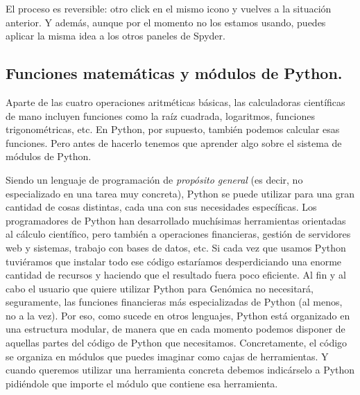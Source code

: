 \documentclass[10pt,a4paper]{article}\usepackage[]{graphicx}\usepackage[]{color}
\newcounter {cont01}
\begin{document}
El proceso es reversible: otro click en el mismo icono y vuelves a la situación anterior. Y además, aunque por el momento no los estamos usando, puedes aplicar la misma idea a los otros paneles de Spyder. 




\subsection{Funciones matemáticas y módulos de Python.}
\label{tut02:subsec:FuncionesMatematicasModulosPython}

Aparte de las cuatro operaciones aritméticas básicas, las calculadoras científicas de mano incluyen funciones como la raíz cuadrada, logaritmos, funciones trigonométricas, etc. En Python, por supuesto, también podemos calcular esas funciones. Pero antes de hacerlo tenemos que aprender algo sobre el sistema de módulos de Python.

Siendo un lenguaje de programación de {\em propósito general} (es decir, no especializado en una tarea muy concreta), Python se puede utilizar para una gran cantidad de cosas distintas, cada una con sus necesidades específicas. Los programadores de Python han desarrollado muchísimas herramientas orientadas al cálculo científico, pero también a operaciones financieras, gestión de servidores web y sistemas, trabajo con bases de datos, etc. Si cada vez que usamos Python tuviéramos que instalar todo ese código estaríamos desperdiciando una enorme cantidad de recursos y haciendo que el resultado fuera poco eficiente. Al fin y al cabo el usuario que quiere utilizar Python para Genómica no necesitará, seguramente, las funciones financieras más especializadas de Python (al menos, no a la vez). Por eso, como sucede en otros lenguajes, Python está organizado en una estructura modular, de manera que en cada momento podemos disponer de aquellas partes del código de Python que necesitamos. Concretamente, el código se organiza en {\sf módulos} que puedes imaginar como cajas de herramientas. Y cuando queremos utilizar una herramienta concreta debemos indicárselo a Python pidiéndole que {\sf importe} el módulo que contiene esa herramienta.
\end{document}
